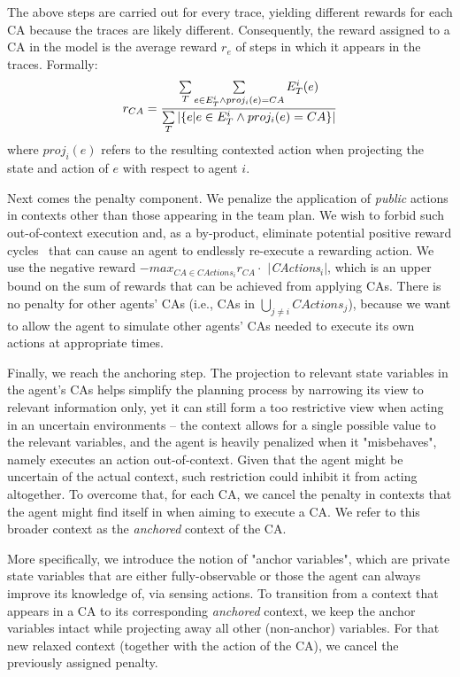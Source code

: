 \documentclass[letterpaper]{article}
\theoremstyle{definition}
\newcommand{\cact}[1]{{\em CActions$_#1$}}
\newcommand{\mcact}[1]{{\mathit{CActions}_#1}}
\begin{document}
The above steps are carried out for every trace,
yielding different rewards for each CA because the traces are likely different. Consequently, the reward assigned to a CA in the model is the average reward 
$r_e$ of steps in which it appears in the traces.
Formally:
\begin{equation*}
    r_{CA} = \frac{\sum\limits_{T} \sum\limits_{e\in E_T^i \\ \land proj_i(e)=CA} E_T^i(e)}
    {\sum\limits_{T}|\{ e|e\in E_T^i \land proj_i(e)=CA \}|} 
\end{equation*}
where $proj_i(e)$ refers to the resulting contexted action when projecting the state and action of $e$ with respect to agent $i$.


Next comes the penalty component. We penalize the application of \emph{public} actions in contexts other
than those appearing in the team plan.
We wish to forbid such out-of-context execution and, as a by-product, eliminate potential positive reward cycles~\cite{RLCYCLES} that can cause an agent to endlessly re-execute a rewarding action. We use the negative reward
$-max_{CA \in \mcact{i}}r_{CA} \cdot$ $|$\cact{i}$|$, which is an upper bound on the sum of rewards that can be achieved from applying CAs. 
There is no penalty for other agents' CAs (i.e., CAs in $\bigcup_{j\neq i} \mcact{j}$), because we want to allow the agent to simulate other agents' CAs needed to execute its own actions at appropriate times.

Finally, we reach the anchoring step. The projection to relevant state variables in the agent's CAs helps simplify the planning process by narrowing its view  to relevant information only,
yet it can still form a too restrictive view when acting in an uncertain environments -- the context allows for a single possible value to the relevant variables, and the agent is heavily penalized when it "misbehaves", namely executes an action out-of-context. Given that the agent might be uncertain of the actual context, such restriction could inhibit it from acting altogether.
To overcome that, for each CA, we cancel the penalty in contexts that the agent might find itself in when aiming to execute a CA. We refer to this broader context as the \emph{anchored} context of the CA. 

More specifically, we introduce the notion of "anchor variables", which are private state variables that are either fully-observable or those the agent can always improve its knowledge of, via sensing actions.
To transition from a context that appears in a CA to its corresponding \emph{anchored} context, we keep the anchor variables intact while projecting away all other (non-anchor) variables. For that new relaxed context (together with the action of the CA), we cancel the previously assigned penalty.
\end{document}
